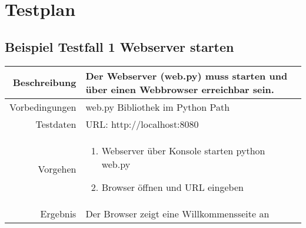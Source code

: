 \section{Testplan}

\subsection{Beispiel Testfall 1 Webserver starten}

\begin{table}[h!]
	\renewcommand{\arraystretch}{1.5}
	\begin{tabular}{|r|p{14cm}|}
		\hline Beschreibung & Der Webserver (web.py) muss starten und über einen Webbrowser erreichbar sein. \\ 
		\hline Vorbedingungen & web.py Bibliothek im Python Path \\ 
		\hline Testdaten & URL: http://localhost:8080 \\ 
		\hline Vorgehen & 
		\begin{enumerate}
			\item Webserver über Konsole starten python web.py
			\item Browser öffnen und URL eingeben
		\end{enumerate} \\ 
		\hline Ergebnis & Der Browser zeigt eine Willkommensseite an \\ 
		\hline 
	\end{tabular}
\end{table}